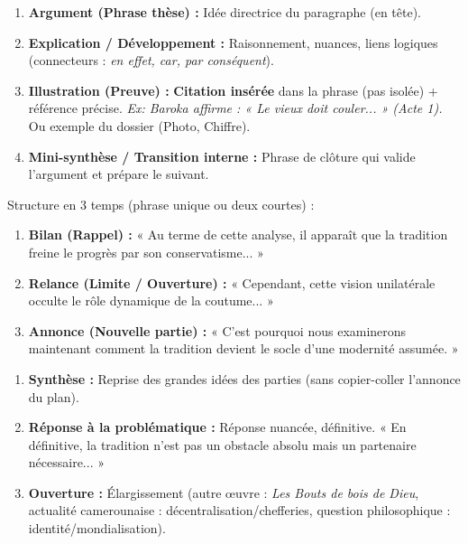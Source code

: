 \documentclass[11pt]{article}
\begin{document}
\begin{methode}
\begin{enumerate}
    \item \textbf{Argument (Phrase thèse) :} Idée directrice du paragraphe (en tête).
    \item \textbf{Explication / Développement :} Raisonnement, nuances, liens logiques (connecteurs : \emph{en effet, car, par conséquent}).
    \item \textbf{Illustration (Preuve) :} \textbf{Citation insérée} dans la phrase (pas isolée) + référence précise. \textit{Ex: Baroka affirme : « Le vieux doit couler... » (Acte 1).} Ou exemple du dossier (Photo, Chiffre).
    \item \textbf{Mini-synthèse / Transition interne :} Phrase de clôture qui valide l'argument et prépare le suivant.
\end{enumerate}
\end{methode}

\begin{methode}
\noindent Structure en 3 temps (phrase unique ou deux courtes) :
\begin{enumerate}
    \item \textbf{Bilan (Rappel) :} « Au terme de cette analyse, il apparaît que la tradition freine le progrès par son conservatisme... »
    \item \textbf{Relance (Limite / Ouverture) :} « Cependant, cette vision unilatérale occulte le rôle dynamique de la coutume... »
    \item \textbf{Annonce (Nouvelle partie) :} « C'est pourquoi nous examinerons maintenant comment la tradition devient le socle d'une modernité assumée. »
\end{enumerate}
\end{methode}

\begin{methode}
\begin{enumerate}
    \item \textbf{Synthèse :} Reprise des grandes idées des parties (sans copier-coller l'annonce du plan).
    \item \textbf{Réponse à la problématique :} Réponse nuancée, définitive. « En définitive, la tradition n'est pas un obstacle absolu mais un partenaire nécessaire... »
    \item \textbf{Ouverture :} Élargissement (autre œuvre : \emph{Les Bouts de bois de Dieu}, actualité camerounaise : décentralisation/chefferies, question philosophique : identité/mondialisation).
\end{enumerate}
\end{methode}
\end{document}
